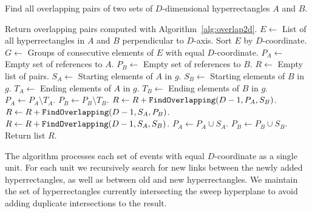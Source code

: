 \documentclass[english,gradu]{tktltiki2018}
\begin{document}
\begin{alg}\label{alg:overlapdd}
Find all overlapping pairs of two sets of $D$-dimensional hyperrectangles $A$ and $B$.
\begin{algorithmic}
		\State Return overlapping pairs computed with Algorithm~\ref{alg:overlap2d}.
	\EndIf
	\State $E\gets$ List of all hyperrectangles in $A$ and $B$ perpendicular to $D$-axis.
	\State Sort $E$ by $D$-coordinate.
	\State $G\gets$ Groups of consecutive elements of $E$ with equal $D$-coordinate.
	\State $P_A\gets$ Empty set of references to $A$.
	\State $P_B\gets$ Empty set of references to $B$.
	\State $R\gets$ Empty list of pairs.
		\State $S_A\gets$ Starting elements of $A$ in $g$.
		\State $S_B\gets$ Starting elements of $B$ in $g$.
		\State $T_A\gets$ Ending elements of $A$ in $g$.
		\State $T_B\gets$ Ending elements of $B$ in $g$.
		\State $P_A\gets P_A\setminus T_A$.
		\State $P_B\gets P_B\setminus T_B$.
		\State $R\gets R + \texttt{FindOverlapping}(D-1,P_A,S_B)$.
		\State $R\gets R + \texttt{FindOverlapping}(D-1,S_A,P_B)$.
		\State $R\gets R + \texttt{FindOverlapping}(D-1,S_A,S_B)$.
		\State $P_A\gets P_A\cup S_A$.
		\State $P_B\gets P_B\cup S_B$.
	\EndFor
	\State Return list $R$.
\EndProcedure
\end{algorithmic}
\end{alg}

The algorithm processes each set of events with equal $D$-coordinate as a single unit.
For each unit we recursively search for new links between the newly added hyperrectangles, as well as between old and new hyperrectangles.
We maintain the set of hyperrectangles currently intersecting the sweep hyperplane to avoid adding duplicate intersections to the result.
\end{document}
